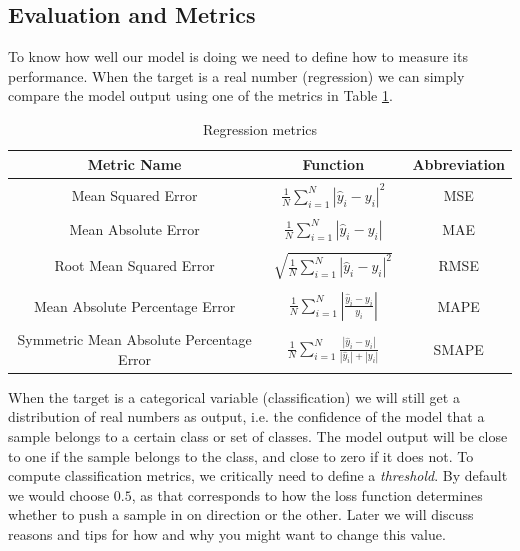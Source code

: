 \subsection{Evaluation and Metrics}
\label{evaluation}
To know how well our model is doing we need to define how to measure its performance.
When the target is a real number (regression) we can simply compare the model output using one of the metrics in Table \ref{table:regression_metrics}.
\begin{table}
    \centering
    \renewcommand{\arraystretch}{1.3}
    \begin{tabular}{|c| c| c|}
    Metric Name & Function & Abbreviation \\[0.5ex] \hline
    Mean Squared Error & $\begin{array} {lcl} \frac{1}{N} \sum_{i=1}^N|\hat{y}_i - y_i|^2\end{array}$ & MSE \\ [0.5ex]
    Mean Absolute Error & $\begin{array} {lcl} \frac{1}{N} \sum_{i=1}^N|\hat{y}_i - y_i|\end{array}$ & MAE \\ [0.5ex]
    Root Mean Squared Error & $\begin{array} {lcl} \sqrt{\frac{1}{N} \sum_{i=1}^N|\hat{y}_i - y_i|^2}\end{array}$ & RMSE\\ [0.5ex]
    Mean Absolute Percentage Error & $\begin{array} {lcl} \frac{1}{N} \sum_{i=1}^N \left| \frac{\hat{y}_i - y_i}{y_i}\right|\end{array}$ & MAPE\\ [0.5ex]
    Symmetric Mean Absolute Percentage Error & $\begin{array} {lcl} \frac{1}{N} \sum_{i=1}^N\frac{|\hat{y}_i - y_i|}{|\hat{y}_i| + |y_i|}\end{array}$  & SMAPE \\ [0.5ex]
    \end{tabular}
    \caption{Regression metrics}
    \label{table:regression_metrics}
\end{table}

When the target is a categorical variable (classification) we will still get a distribution of real numbers as output, i.e. the confidence of the model that a sample belongs to a certain class or set of classes.
The model output will be close to one if the sample belongs to the class, and close to zero if it does not.
To compute classification metrics, we critically need to define a \textit{threshold}.
By default we would choose $0.5$, as that corresponds to how the loss function determines whether to push a sample in on direction or the other.
Later we will discuss reasons and tips for how and why you might want to change this value.

